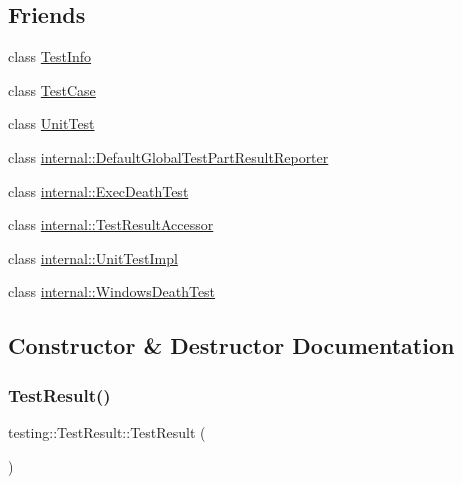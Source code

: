 \subsection*{Friends}
\begin{DoxyCompactItemize}
\item 
class \mbox{\hyperlink{classtesting_1_1_test_result_a4c49c2cdb6c328e6b709b4542f23de3c}{Test\+Info}}
\item 
class \mbox{\hyperlink{classtesting_1_1_test_result_aff779e55b06adfa7c0088bd10253f0f0}{Test\+Case}}
\item 
class \mbox{\hyperlink{classtesting_1_1_test_result_a832b4d233efee1a32feb0f4190b30d39}{Unit\+Test}}
\item 
class \mbox{\hyperlink{classtesting_1_1_test_result_abae39633da9932847b41cb80efd62115}{internal\+::\+Default\+Global\+Test\+Part\+Result\+Reporter}}
\item 
class \mbox{\hyperlink{classtesting_1_1_test_result_adf5553cae6aea6f8648d47e299237e34}{internal\+::\+Exec\+Death\+Test}}
\item 
class \mbox{\hyperlink{classtesting_1_1_test_result_ae762da04e74a0d3b0daded3c5bd4a8e8}{internal\+::\+Test\+Result\+Accessor}}
\item 
class \mbox{\hyperlink{classtesting_1_1_test_result_acc0a5e7573fd6ae7ad1878613bb86853}{internal\+::\+Unit\+Test\+Impl}}
\item 
class \mbox{\hyperlink{classtesting_1_1_test_result_a6aeedc04a0590fcc1b3c5f687dbb0f9f}{internal\+::\+Windows\+Death\+Test}}
\end{DoxyCompactItemize}


\subsection{Constructor \& Destructor Documentation}
\mbox{\label{classtesting_1_1_test_result_a5cf5dd6f416b7334ea601aab21a2fda5}} 
\subsubsection{\texorpdfstring{TestResult()}{TestResult()}}
{\footnotesize\ttfamily testing\+::\+Test\+Result\+::\+Test\+Result (\begin{DoxyParamCaption}{ }\end{DoxyParamCaption})}

